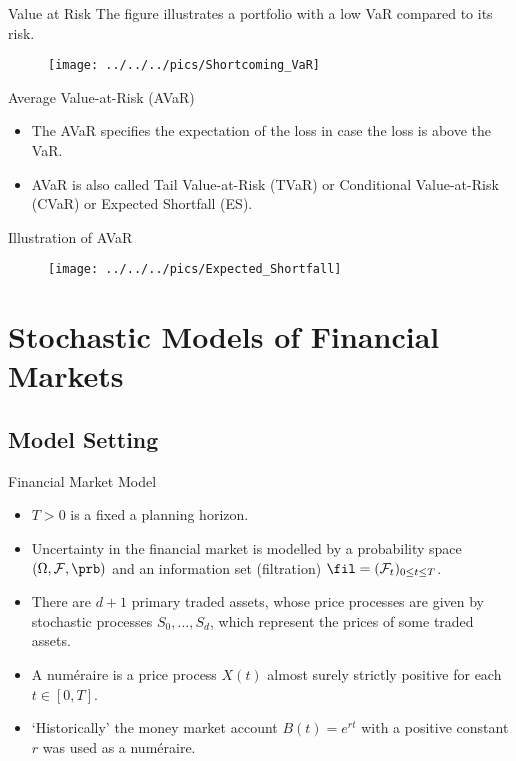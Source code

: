 {Value at Risk}
The figure illustrates a portfolio with a low VaR compared to its risk.
\begin{figure}
	\centering
		\texttt{[image: ../../../pics/Shortcoming\_VaR]}
	\label{fig:Shortcoming_VaR}
\end{figure}




{Average Value-at-Risk (AVaR) }
\begin{itemize}
\item<1-> The AVaR specifies the expectation of the loss in case the loss is above the VaR.
\item<2-> AVaR is also called Tail Value-at-Risk (TVaR) or Conditional
Value-at-Risk (CVaR) or  Expected Shortfall (ES).
\end{itemize}



{Illustration of AVaR}
\begin{figure}
	\centering
		\texttt{[image: ../../../pics/Expected\_Shortfall]}
	\label{fig:Expected_Shortfall}
\end{figure}



\section{Stochastic Models of Financial Markets}
\subsection{Model Setting}

{ Financial Market Model}
\begin{itemize}
\item<1->
$T>0$ is a fixed a planning horizon.
\item<2->
Uncertainty in the financial market is modelled by a probability
space $(\Omega, {\cal F},\prb)$ and an information set  (filtration) $\fil =({\cal
F}_t)_{0\leq t\leq T}$.
\item<3->
There are $d+1$ primary traded assets, whose price processes are
given by stochastic processes $S_0, \ldots, S_d$, which represent
the prices of some traded assets.
\item<4->
A num\'{e}raire is a price process $X(t)$ almost surely strictly
positive for each $t \in [0,T]$.
\item<5->
\lq {Historically}' the money market account $B(t)=e^{rt}$ with a
positive constant $r$ was used as a
num\'{e}raire.
\end{itemize}


